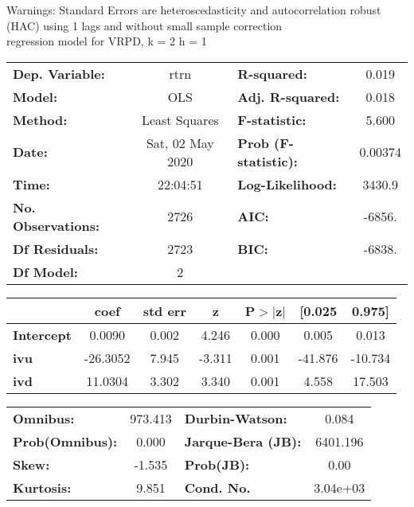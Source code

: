Warnings: \newline
 [1] Standard Errors are heteroscedasticity and autocorrelation robust (HAC) using 1 lags and without small sample correction\\ 

regression model for VRPD, k = 2 h = 1\begin{center}
\begin{tabular}{lclc}
\toprule
\textbf{Dep. Variable:}    &       rtrn       & \textbf{  R-squared:         } &     0.019   \\
\textbf{Model:}            &       OLS        & \textbf{  Adj. R-squared:    } &     0.018   \\
\textbf{Method:}           &  Least Squares   & \textbf{  F-statistic:       } &     5.600   \\
\textbf{Date:}             & Sat, 02 May 2020 & \textbf{  Prob (F-statistic):} &  0.00374    \\
\textbf{Time:}             &     22:04:51     & \textbf{  Log-Likelihood:    } &    3430.9   \\
\textbf{No. Observations:} &        2726      & \textbf{  AIC:               } &    -6856.   \\
\textbf{Df Residuals:}     &        2723      & \textbf{  BIC:               } &    -6838.   \\
\textbf{Df Model:}         &           2      & \textbf{                     } &             \\
\bottomrule
\end{tabular}
\begin{tabular}{lcccccc}
                   & \textbf{coef} & \textbf{std err} & \textbf{z} & \textbf{P$> |$z$|$} & \textbf{[0.025} & \textbf{0.975]}  \\
\midrule
\textbf{Intercept} &       0.0090  &        0.002     &     4.246  &         0.000        &        0.005    &        0.013     \\
\textbf{ivu}       &     -26.3052  &        7.945     &    -3.311  &         0.001        &      -41.876    &      -10.734     \\
\textbf{ivd}       &      11.0304  &        3.302     &     3.340  &         0.001        &        4.558    &       17.503     \\
\bottomrule
\end{tabular}
\begin{tabular}{lclc}
\textbf{Omnibus:}       & 973.413 & \textbf{  Durbin-Watson:     } &    0.084  \\
\textbf{Prob(Omnibus):} &   0.000 & \textbf{  Jarque-Bera (JB):  } & 6401.196  \\
\textbf{Skew:}          &  -1.535 & \textbf{  Prob(JB):          } &     0.00  \\
\textbf{Kurtosis:}      &   9.851 & \textbf{  Cond. No.          } & 3.04e+03  \\
\bottomrule
\end{tabular}
\end{center}

